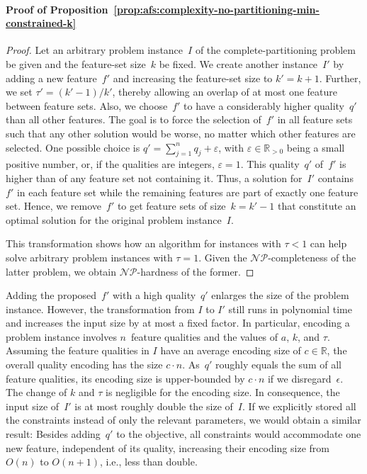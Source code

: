 \documentclass{article}
\theoremstyle{definition}
\begin{document}
\paragraph{Proof of Proposition~\ref{prop:afs:complexity-no-partitioning-min-constrained-k}}
%
\begin{proof}
Let an arbitrary problem instance~$I$ of the complete-partitioning problem be given and the feature-set size~$k$ be fixed.
We create another instance~$I'$ by adding a new feature~$f'$ and increasing the feature-set size to $k' = k + 1$.
Further, we set $\tau' = (k' - 1) / k'$, thereby allowing an overlap of at most one feature between feature sets.
Also, we choose~$f'$ to have a considerably higher quality~$q'$ than all other features.
The goal is to force the selection of~$f'$ in all feature sets such that any other solution would be worse, no matter which other features are selected.
One possible choice is $q' = \sum_{j=1}^n q_j + \varepsilon$, with $\varepsilon \in \mathbb{R}_{> 0}$ being a small positive number, or, if the qualities are integers, $\varepsilon = 1$.
This quality~$q'$ of~$f'$ is higher than of any feature set not containing it.
Thus, a solution for~$I'$ contains~$f'$ in each feature set while the remaining features are part of exactly one feature set.
Hence, we remove~$f'$ to get feature sets of size~$k = k' - 1$ that constitute an optimal solution for the original problem instance~$I$.
	
This transformation shows how an algorithm for instances with $\tau < 1$ can help solve arbitrary problem instances with $\tau = 1$.
Given the $\mathcal{NP}$-completeness of the latter problem, we obtain $\mathcal{NP}$-hardness of the former.
\end{proof}
%
Adding the proposed~$f'$ with a high quality~$q'$ enlarges the size of the problem instance.
However, the transformation from $I$ to $I'$ still runs in polynomial time and increases the input size by at most a fixed factor.
In particular, encoding a problem instance involves $n$~feature qualities and the values of $a$, $k$, and $\tau$.
Assuming the feature qualities in $I$ have an average encoding size of $c \in \mathbb{R}$, the overall quality encoding has the size $c \cdot n$.
As~$q'$ roughly equals the sum of all feature qualities, its encoding size is upper-bounded by $c \cdot n$ if we disregard~$\epsilon$.
The change of $k$ and $\tau$ is negligible for the encoding size.
In consequence, the input size of~$I'$ is at most roughly double the size of~$I$.
If we explicitly stored all the constraints instead of only the relevant parameters, we would obtain a similar result:
Besides adding~$q'$ to the objective, all constraints would accommodate one new feature, independent of its quality, increasing their encoding size from $O(n)$ to $O(n+1)$, i.e., less than double.
\end{document}
